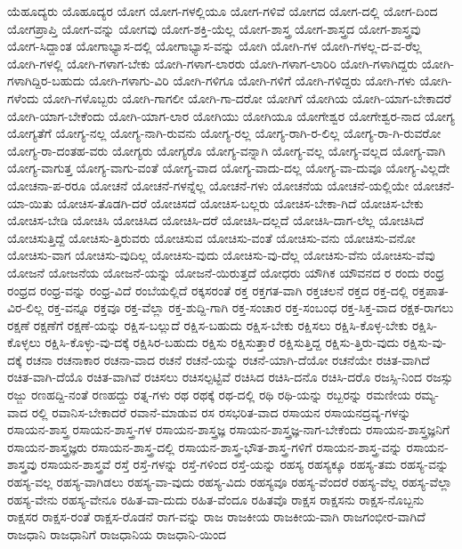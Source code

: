 {ಯೆಹೂದ್ಯರು
ಯೊಹೂದ್ಯರ
ಯೋಗ
ಯೋಗ-ಗಳಲ್ಲಿಯೂ
ಯೋಗ-ಗಳಿವೆ
ಯೋಗದ
ಯೋಗ-ದಲ್ಲಿ
ಯೋಗ-ದಿಂದ
ಯೋಗಪ್ರಾಪ್ತಿ
ಯೋಗ-ವನ್ನು
ಯೋಗವು
ಯೋಗ-ಶಕ್ತಿ-ಯೆಲ್ಲ
ಯೋಗ-ಶಾಸ್ತ್ರ
ಯೋಗ-ಶಾಸ್ತ್ರದ
ಯೋಗ-ಶಾಸ್ತ್ರವು
ಯೋಗ-ಸಿದ್ದಾಂತ
ಯೋಗಾಭ್ಯಾಸ-ದಲ್ಲಿ
ಯೋಗಾಭ್ಯಾಸ-ವನ್ನು
ಯೋಗಿ
ಯೋಗಿ-ಗಳ
ಯೋಗಿ-ಗಳಲ್ಲ-ದ-ವ-ರೆಲ್ಲ
ಯೋಗಿ-ಗಳಲ್ಲಿ
ಯೋಗಿ-ಗಳಾಗ-ಬೇಕು
ಯೋಗಿ-ಗಳಾಗ-ಲಾರರು
ಯೋಗಿ-ಗಳಾಗ-ಲಾರಿರಿ
ಯೋಗಿ-ಗಳಾಗಿದ್ದರು
ಯೋಗಿ-ಗಳಾಗಿದ್ದಿರ-ಬಹುದು
ಯೋಗಿ-ಗಳಾಗು-ವಿರಿ
ಯೋಗಿ-ಗಳಿಗೂ
ಯೋಗಿ-ಗಳಿಗೆ
ಯೋಗಿ-ಗಳಿದ್ದರು
ಯೋಗಿ-ಗಳು
ಯೋಗಿ-ಗಳೆಂದು
ಯೋಗಿ-ಗಳೊಬ್ಬರು
ಯೋಗಿ-ಗಾಗಲೀ
ಯೋಗಿ-ಗಾ-ದರೋ
ಯೋಗಿಗೆ
ಯೋಗಿಯ
ಯೋಗಿ-ಯಾಗ-ಬೇಕಾದರೆ
ಯೋಗಿ-ಯಾಗ-ಬೇಕೆಂದು
ಯೋಗಿ-ಯಾಗ-ಲಾರ
ಯೋಗಿಯು
ಯೋಗಿಯೂ
ಯೋಗೇಶ್ವರ
ಯೋಗೇಶ್ವರ-ನಾದ
ಯೋಗ್ಯ
ಯೋಗ್ಯತೆಗೆ
ಯೋಗ್ಯ-ನಲ್ಲ
ಯೋಗ್ಯ-ನಾಗಿ-ರುವನು
ಯೋಗ್ಯ-ರಲ್ಲ
ಯೋಗ್ಯ-ರಾಗಿ-ರ-ಲಿಲ್ಲ
ಯೋಗ್ಯ-ರಾ-ಗಿ-ರುವರೋ
ಯೋಗ್ಯ-ರಾ-ದಂತಹ-ವರು
ಯೋಗ್ಯರು
ಯೋಗ್ಯರೊ
ಯೋಗ್ಯ-ವನ್ನಾಗಿ
ಯೋಗ್ಯ-ವಲ್ಲ
ಯೋಗ್ಯ-ವಲ್ಲದ
ಯೋಗ್ಯ-ವಾಗಿ
ಯೋಗ್ಯ-ವಾಗುತ್ತ
ಯೋಗ್ಯ-ವಾಗು-ವಂತೆ
ಯೋಗ್ಯ-ವಾದ
ಯೋಗ್ಯ-ವಾದು-ದಲ್ಲ
ಯೋಗ್ಯ-ವಾ-ದುವೂ
ಯೋಗ್ಯ-ವಿಲ್ಲದೇ
ಯೋಚನಾ-ಪ-ರರೂ
ಯೋಚನೆ
ಯೋಚನೆ-ಗಳನ್ನೆಲ್ಲ
ಯೋಚನೆ-ಗಳು
ಯೋಚನೆಯ
ಯೋಚನೆ-ಯಲ್ಲಿಯೇ
ಯೋಚನೆ-ಯಾ-ಯಿತು
ಯೋಚಿಸ-ತೊಡಗಿ-ದರೆ
ಯೋಚಿಸದೆ
ಯೋಚಿಸ-ಬಲ್ಲರು
ಯೋಚಿಸ-ಬೇಕಾ-ಗಿದೆ
ಯೋಚಿಸ-ಬೇಕು
ಯೋಚಿಸ-ಬೇಡಿ
ಯೋಚಿಸಿ
ಯೋಚಿಸಿದ
ಯೋಚಿಸಿ-ದರೆ
ಯೋಚಿಸಿ-ದಲ್ಲದೆ
ಯೋಚಿಸಿ-ದಾಗ-ಲೆಲ್ಲ
ಯೋಚಿಸಿದೆ
ಯೋಚಿಸುತ್ತಿದ್ದೆ
ಯೋಚಿಸು-ತ್ತಿರುವರು
ಯೋಚಿಸುವ
ಯೋಚಿಸು-ವಂತೆ
ಯೋಚಿಸು-ವನು
ಯೋಚಿಸು-ವನೋ
ಯೋಚಿಸು-ವಾಗ
ಯೋಚಿಸು-ವುದಿಲ್ಲ
ಯೋಚಿಸು-ವುದು
ಯೋಚಿಸು-ವು-ದೆಲ್ಲ
ಯೋಚಿಸು-ವೆನು
ಯೋಚಿಸು-ವೆವು
ಯೋಜನೆ
ಯೋಜನೆಯ
ಯೋಜನೆ-ಯನ್ನು
ಯೋಜನೆ-ಯಿರುತ್ತದೆ
ಯೋಧರು
ಯೌಗಿಕ
ಯೌವನದ
ರ
ರಂದು
ರಂಧ್ರ
ರಂಧ್ರದ
ರಂಧ್ರ-ವನ್ನು
ರಂಧ್ರ-ವಿದೆ
ರಂಬೆಯಲ್ಲಿದೆ
ರಕ್ಕಸರಂತೆ
ರಕ್ತ
ರಕ್ತಗತ-ವಾಗಿ
ರಕ್ತಚಲನೆ
ರಕ್ತದ
ರಕ್ತ-ದಲ್ಲಿ
ರಕ್ತಪಾತ-ವಿರ-ಲಿಲ್ಲ
ರಕ್ತ-ವನ್ನೂ
ರಕ್ತವೂ
ರಕ್ತ-ವೆಲ್ಲಾ
ರಕ್ತ-ಶುದ್ದಿ-ಗಾಗಿ
ರಕ್ತ-ಸಂಚಾರ
ರಕ್ತ-ಸಂಬಂಧ
ರಕ್ತ-ಸಿಕ್ತ-ವಾದ
ರಕ್ಷಕ-ರಾಗಲು
ರಕ್ಷಣೆ
ರಕ್ಷಣೆಗೆ
ರಕ್ಷಣೆ-ಯನ್ನು
ರಕ್ಷಿಸ-ಬಲ್ಲುದೆ
ರಕ್ಷಿಸ-ಬಹುದು
ರಕ್ಷಿಸ-ಬೇಕು
ರಕ್ಷಿಸಲು
ರಕ್ಷಿಸಿ-ಕೊಳ್ಳ-ಬೇಕು
ರಕ್ಷಿಸಿ-ಕೊಳ್ಳಲು
ರಕ್ಷಿಸಿ-ಕೊಳ್ಳು-ವು-ದಕ್ಕೆ
ರಕ್ಷಿಸಿರ-ಬಹುದು
ರಕ್ಷಿಸು
ರಕ್ಷಿಸುತ್ತಾರೆ
ರಕ್ಷಿಸುತ್ತಿದ್ದ
ರಕ್ಷಿಸು-ತ್ತಿರು-ವುದು
ರಕ್ಷಿಸು-ವು-ದಕ್ಕೆ
ರಚನಾ
ರಚನಾಕಾರ
ರಚನಾ-ವಾದ
ರಚನೆ
ರಚನೆ-ಯನ್ನು
ರಚನೆ-ಯಾಗಿ-ದೆಯೋ
ರಚನೆಯೇ
ರಚಿತ-ವಾಗಿದೆ
ರಚಿತ-ವಾಗಿ-ದೆಯೊ
ರಚಿತ-ವಾಗಿವೆ
ರಚಿಸಲು
ರಚಿಸಲ್ಪಟ್ಟಿವೆ
ರಚಿಸಿದ
ರಚಿಸಿ-ದನೊ
ರಚಿಸಿ-ದರೊ
ರಜಸ್ಸಿ-ನಿಂದ
ರಜಸ್ಸು
ರಜ್ಜು
ರಣಹದ್ದಿ-ನಂತೆ
ರಣಹದ್ದು
ರತ್ನ-ಗಳು
ರಥ
ರಥಕ್ಕೆ
ರಥ-ದಲ್ಲಿ
ರಥಿ
ರಥಿ-ಯನ್ನು
ರಬ್ಬರನ್ನು
ರಮಣೀಯ
ರಮ್ಯ-ವಾದ
ರಲ್ಲಿ
ರವಾನಿಸ-ಬೇಕಾದರೆ
ರವಾನೆ-ಮಾಡುವ
ರಸ
ರಸಭರಿತ-ವಾದ
ರಸಾಯನ
ರಸಾಯನದ್ರವ್ಯ-ಗಳನ್ನು
ರಸಾಯನ-ಶಾಸ್ತ್ರ
ರಸಾಯನ-ಶಾಸ್ತ್ರ-ಗಳ
ರಸಾಯನ-ಶಾಸ್ತ್ರಜ್ಞ
ರಸಾಯನ-ಶಾಸ್ತ್ರಜ್ಞ-ನಾಗ-ಬೇಕೆಂದು
ರಸಾಯನ-ಶಾಸ್ತ್ರಜ್ಞನಿಗೆ
ರಸಾಯನ-ಶಾಸ್ತ್ರಜ್ಞರು
ರಸಾಯನ-ಶಾಸ್ತ್ರ-ದಲ್ಲಿ
ರಸಾಯನ-ಶಾಸ್ತ್ರ-ಭೌತ-ಶಾಸ್ತ್ರ-ಗಳಿಗೆ
ರಸಾಯನ-ಶಾಸ್ತ್ರ-ವನ್ನು
ರಸಾಯನ-ಶಾಸ್ತ್ರವು
ರಸಾಯನ-ಶಾಸ್ತ್ರವೆ
ರಸ್ತೆ
ರಸ್ತೆ-ಗಳನ್ನು
ರಸ್ತೆ-ಗಳಿಂದ
ರಸ್ತೆ-ಯನ್ನು
ರಹಸ್ಯ
ರಹಸ್ಯಕ್ಕೂ
ರಹಸ್ಯ-ತಮ
ರಹಸ್ಯ-ವನ್ನು
ರಹಸ್ಯ-ವಲ್ಲ
ರಹಸ್ಯ-ವಾಗಿಡಲು
ರಹಸ್ಯ-ವಾ-ವುದು
ರಹಸ್ಯ-ವಿದು
ರಹಸ್ಯವೂ
ರಹಸ್ಯ-ವೆಂದರೆ
ರಹಸ್ಯ-ವೆಲ್ಲ
ರಹಸ್ಯ-ವೆಲ್ಲಾ
ರಹಸ್ಯ-ವೇನು
ರಹಸ್ಯ-ವೇನೂ
ರಹಿತ-ವಾ-ದುದು
ರಹಿತ-ವೆಂದೂ
ರಹಿತವೊ
ರಾಕ್ಷಸ
ರಾಕ್ಷಸನು
ರಾಕ್ಷಸ-ನೊಬ್ಬನು
ರಾಕ್ಷಸರ
ರಾಕ್ಷಸ-ರಂತೆ
ರಾಕ್ಷಸ-ರೊಡನೆ
ರಾಗ-ವನ್ನು
ರಾಜ
ರಾಜಕೀಯ
ರಾಜಕೀಯ-ವಾಗಿ
ರಾಜಗಂಭೀರ-ವಾಗಿದೆ
ರಾಜಧಾನಿ
ರಾಜಧಾನಿಗೆ
ರಾಜಧಾನಿಯ
ರಾಜಧಾನಿ-ಯಿಂದ
}

